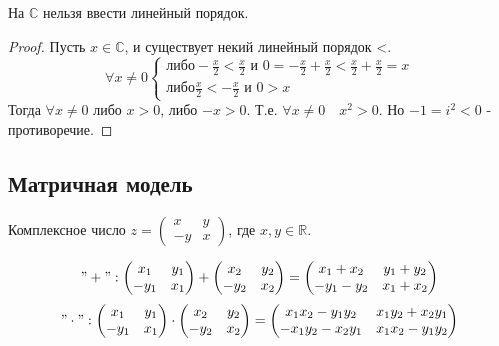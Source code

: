 \begin{statement}
    На $\mathbb{C}$ нельзя ввести линейный порядок.
    \begin{proof}
        Пусть $x \in \mathbb{C}$, и существует некий линейный порядок <.
        \[\forall x \neq 0
        \begin{cases}
            \text{либо} -\frac{x}{2} < \frac{x}{2} \text{ и } 0 = -\frac{x}{2} + \frac{x}{2} < \frac{x}{2} + \frac{x}{2} = x\\
            \text{либо} \frac{x}{2} < -\frac{x}{2} \text{ и } 0 > x
        \end{cases}
        \]
        Тогда $\forall x \neq 0$ либо $x > 0$, либо $-x > 0$. Т.е. $\forall x \neq 0 \quad x^2 > 0$.
        Но $-1 = i^2 < 0$ - противоречие.
    \end{proof}
\end{statement}

\bigskip

\subsection{Матричная модель}
Комплексное число $z = \begin{pmatrix}
    x & y\\
    -y & x
\end{pmatrix}$, где $x, y \in \mathbb{R}$.

\["+": 
    \begin{pmatrix}
        x_1 & y_1 \\
        -y_1 & x_1
    \end{pmatrix} 
    + 
    \begin{pmatrix}
        x_2 & y_2 \\
        -y_2 & x_2 \\
    \end{pmatrix}
    =
    \begin{pmatrix}
        x_1 + x_2 & y_1 + y_2 \\
        -y_1 - y_2 & x_1 + x_2
    \end{pmatrix}
\]
\["\cdot": 
    \begin{pmatrix}
        x_1 & y_1 \\
        -y_1 & x_1
    \end{pmatrix} 
    \cdot
    \begin{pmatrix}
        x_2 & y_2 \\
        -y_2 & x_2 \\
    \end{pmatrix}
    =
    \begin{pmatrix}
        x_1x_2 - y_1y_2 & x_1y_2 + x_2y_1 \\
        -x_1y_2 - x_2y_1 & x_1x_2 - y_1y_2
    \end{pmatrix}
\]

